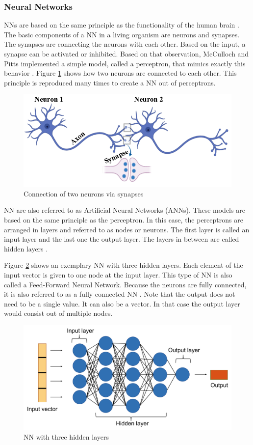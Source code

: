 \subsubsection*{Neural Networks}\label{NN chapter}
NNs are based on the same principle as the functionality of the human brain \cite{Janiesch}.
The basic components of a NN in a living organism are neurons and synapses. The synapses are connecting the neurons with each other. Based on the input, a synapse can be activated or inhibited. Based on that observation, McCulloch and Pitts implemented a simple model, called a perceptron, that mimics exactly this behavior \cite{Theodoridis}.
Figure \ref{fig:2nn} shows how two neurons are connected to each other. This principle is reproduced many times to create a NN out of perceptrons.
\begin{figure}[H]
	\centering
	\includegraphics[width=0.8\linewidth]{IMGs/2NN.png}
	\caption{Connection of two neurons via synapses \cite{Das}}
	\label{fig:2nn}
\end{figure}

NN are also referred to as Artificial Neural Networks (ANNs). These models are based on the same principle as the perceptron. In this case, the perceptrons are arranged in layers and referred to as nodes or neurons. The first layer is called an input layer and the last one the output layer. The layers in between are called hidden layers \cite{JOOST}. 

Figure \ref{fig:NN1} shows an exemplary NN with three hidden layers. Each element of the input vector is given to one node at the input layer. This type of NN is also called a Feed-Forward Neural Network. Because the neurons are fully connected, it is also referred to as a fully connected NN \cite{Sainath}. Note that the output does not need to be a single value. It can also be a vector. In that case the output layer would consist out of multiple nodes.

\begin{figure}[H]
	\centering
	\includegraphics[width=0.85\linewidth]{IMGs/NN1.png}
	\caption{NN with three hidden layers}
	\label{fig:NN1}
\end{figure}
 
